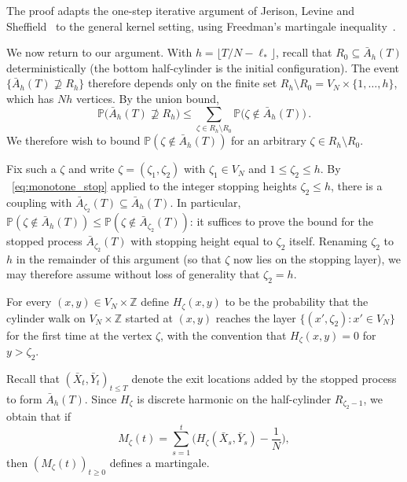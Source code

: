 \documentclass[11pt,a4paper,reqno]{amsart}
\theoremstyle{definition}
\newcommand{\bbE}{{\ensuremath{\mathbb E}} }
\newcommand{\bbP}{{\ensuremath{\mathbb P}} }
\newcommand{\bbZ}{{\ensuremath{\mathbb Z}} }
\begin{document}
The proof adapts the one-step iterative argument of Jerison, Levine and Sheffield~\cite{jerison2012logarithmic} to the general kernel setting, using Freedman's martingale inequality~\cite{freedman1975tail}.

We now return to our argument. With $h = \lfloor T/N - \ell_*\rfloor$, recall that $R_0 \subseteq \bar A_h(T)$ deterministically (the bottom half-cylinder is the initial configuration). The event $\{\bar A_h(T) \not\supseteq R_h\}$ therefore depends only on the finite set $R_h \setminus R_0 = V_N \times \{1, \ldots, h\}$, which has $Nh$ vertices. By the union bound,
	\begin{equation}\label{UB}
	 \bbP \big( \bar A_h(T) \not\supseteq R_h \big) \leq \sum_{\zeta \in R_h \setminus R_0} \bbP\!\big( \zeta \notin \bar A_h(T) \big)\,.
	\end{equation}
We therefore wish to bound $\bbP(\zeta \notin \bar A_h(T))$ for an arbitrary $\zeta \in R_h \setminus R_0$.

Fix such a $\zeta$ and write $\zeta = (\zeta_1, \zeta_2)$ with $\zeta_1 \in V_N$ and $1 \leq \zeta_2 \leq h$.
By ~\eqref{eq:monotone_stop} applied to the integer stopping heights $\zeta_2 \leq h$, there is a coupling with $\bar A_{\zeta_2}(T) \subseteq \bar A_h(T)$. In particular, $\bbP(\zeta \notin \bar A_h(T)) \leq \bbP(\zeta \notin \bar A_{\zeta_2}(T))$: it suffices to prove the bound for the stopped process $\bar A_{\zeta_2}(T)$ with stopping height equal to $\zeta_2$ itself. Renaming $\zeta_2$ to $h$ in the remainder of this argument (so that $\zeta$ now lies on the stopping layer), we may therefore assume without loss of generality that $\zeta_2 = h$.

For every $(x,y) \in V_N \times \bbZ$ define $H_\zeta(x,y)$ to be the probability that the cylinder walk on $V_N \times \bbZ$ started at $(x,y)$ reaches the layer $\{ (x', \zeta_2) : x' \in V_N \}$ for the first time at the vertex $\zeta$, with the convention that $H_\zeta(x,y) = 0$ for $y > \zeta_2$.

Recall that $(\bar X_t, \bar Y_t)_{t \leq T}$ denote the exit locations added by the stopped process to form $\bar A_h(T)$.
Since $H_\zeta$ is discrete harmonic on the half-cylinder $R_{\zeta_2 - 1}$, we obtain that if 
$$ M_\zeta(t) = \sum_{s=1}^t \Big( H_\zeta(\bar X_s,\bar Y_s) - \frac1N \Big) , $$
then $(M_\zeta(t) )_{t\geq 0} $ defines a martingale.  
\end{document}
